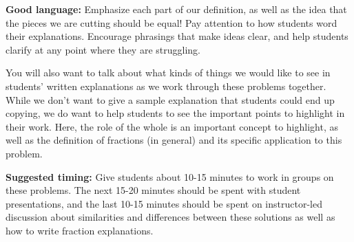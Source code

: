 \documentclass[nooutcomes,noauthor, handout]{ximera}
\begin{document}
\begin{instructorNotes}
{\bf Good language:}  Emphasize each part of our definition, as well as the idea that the pieces we are cutting should be equal! Pay attention to how students word their explanations. Encourage phrasings that make ideas clear, and help students clarify at any point where they are struggling. 

You will also want to talk about what kinds of things we would like to see in students' written explanations as we work through these problems together. While we don't want to give a sample explanation that students could end up copying, we do want to help students to see the important points to highlight in their work. Here, the role of the whole is an important concept to highlight, as well as the definition of fractions (in general) and its specific application to this problem.




{\bf Suggested timing:} Give students about 10-15 minutes to work in groups on these problems. The next 15-20 minutes should be spent with student presentations, and the last 10-15 minutes should be spent on instructor-led discussion about similarities and differences between these solutions as well as how to write fraction explanations.




\end{instructorNotes}
\end{document}

